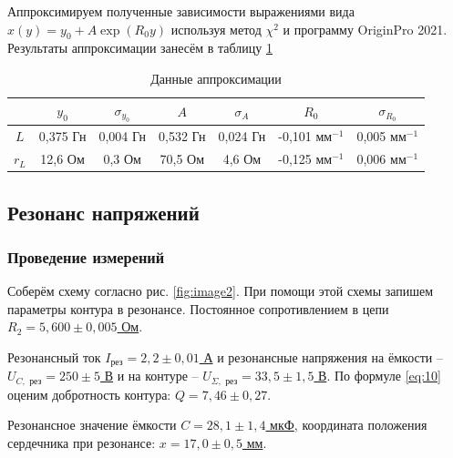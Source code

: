 \documentclass[a4paper,12pt]{article} %
\begin{document}
\begin{center}
\end{center}

Аппроксимируем полученные зависимости выражениями вида $ x(y) = y_0 + A \exp(R_0 y) $ используя метод $ \chi^2 $ и программу OriginPro 2021. Результаты аппроксимации занесём в таблицу \ref{tab:3}

\begin{table}[H]
	\centering
	\begin{tabular}{|c|c|c|c|c|c|c|}
		\hline
		& $ y_0 $       & $ \sigma_{y_0} $      & $ A $       & $ \sigma_A $       & $ R_0 $       & $ \sigma_{R_0} $      \\ \hline
		$ L $    & 0,375 Гн  & 0,004 Гн & 0,532 Гн & 0,024 Гн & -0,101 мм$ ^{-1} $ & 0,005 мм$ ^{-1} $  \\ \hline
		$ r_L $ & 12,6 Ом & 0,3 Ом & 70,5 Ом & 4,6 Ом & -0,125 мм$ ^{-1} $ & 0,006 мм$ ^{-1} $ \\ \hline
	\end{tabular}
	\caption{Данные аппроксимации}
	\label{tab:3}
\end{table}

\subsection{Резонанс напряжений}

\subsubsection{Проведение измерений}

Соберём схему согласно рис. \ref{fig:image2}. При помощи этой схемы запишем параметры контура в резонансе. Постоянное сопротивлением в цепи \underline{$ R_2 = 5,600 \pm 0,005 $ Ом}.

Резонансный ток \underline{$ I_{\text{рез}} = 2,2 \pm 0,01 $ А} и резонансные напряжения на ёмкости -- \\
\underline{$ U_{C, \text{ рез}} = 250 \pm 5 $ В} и на контуре  -- \underline{$ U_{\Sigma, \text{ рез}} = 33,5 \pm 1,5 $ В}. По формуле \eqref{eq:10} оценим добротность контура: \underline{$ Q = 7,46 \pm 0,27 $}.

Резонансное значение ёмкости \underline{$ C = 28,1 \pm 1,4 $ мкФ}, координата положения сердечника при резонансе: \underline{$ x = 17,0 \pm 0,5 $ мм}.
\end{document}
